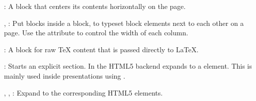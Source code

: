 \documentclass{book}
\begin{document}
\begin{mdUl}[class={list-star,loose},data-line={1964}]
\begin{mdLi}[data-line={1982}]
\begin{mdP}[data-line={1982}]%
{}%
{}: A block that centers its contents horizontally on the page.%
\end{mdP}%
\end{mdLi}%
\begin{mdLi}[data-line={1983}]%
\begin{mdP}[data-line={1983}]%
{}%
{}, %
{}%
{}: Put %
{}%
{} blocks inside a %
{}%
{} block, to typeset block elements
  next to each other on a page. Use the %
{}%
{} attribute to control the width of each
  column.%
\end{mdP}%
\end{mdLi}%
\begin{mdLi}[data-line={1986}]%
\begin{mdP}[data-line={1986}]%
{}%
{}: A block for raw TeX content that is passed directly to LaTeX.%
\end{mdP}%
\end{mdLi}%
\begin{mdLi}[data-line={1987}]%
\begin{mdP}[data-line={1987}]%
{}%
{}: Starts an explicit section. In the HTML5 backend expands to a %
{}%
{} element.
  This is mainly used inside presentations using %
{}%
{}.%
\end{mdP}%
\end{mdLi}%
\begin{mdLi}[data-line={1989}]%
\begin{mdP}[data-line={1989}]%
{}%
{}, %
{}%
{}, %
{}%
{}: Expand to the corresponding HTML5 elements.%
\end{mdP}%
\end{mdLi}%

\end{mdUl}
\end{document}
